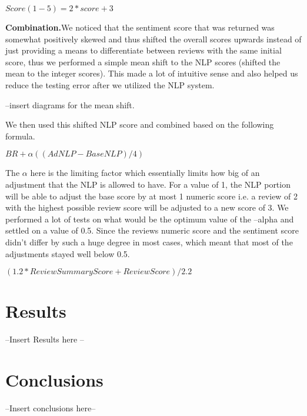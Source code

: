 \documentclass{article} %
\begin{document}
$Score (1-5 ) = 2*score + 3$


\textbf{Combination.}We noticed that the sentiment score that was returned was somewhat positively skewed and thus shifted the overall scores upwards instead of just providing a means to differentiate between reviews with the same initial score, thus we performed a simple mean shift to the NLP scores (shifted the mean to the integer scores). This made a lot of intuitive sense and also helped us reduce the testing error after we utilized the NLP system. 

--insert diagrams for the mean shift. 

We then used this shifted NLP score and combined based on the following formula. 

$BR + \alpha((AdNLP - BaseNLP)/4) $

The $\alpha$ here is the limiting factor which essentially limits how big of an adjustment that the NLP is allowed to have. For a value of 1, the NLP portion will be able to adjust the base score by at most 1 numeric score i.e. a review of 2 with the highest possible review score will be adjusted to a new score of 3. We performed a lot of tests on what would be the optimum value of the --alpha and settled on a value of 0.5. Since the reviews numeric score and the sentiment score didn't differ by such a huge degree in most cases, which meant that most of the adjustments stayed well below 0.5.  

$(1.2 * Review Summary Score  + Review Score ) /2.2 $

\section{Results}

--Insert Results here --


\section{Conclusions}

--Insert conclusions here-- 



	
\end{document}
